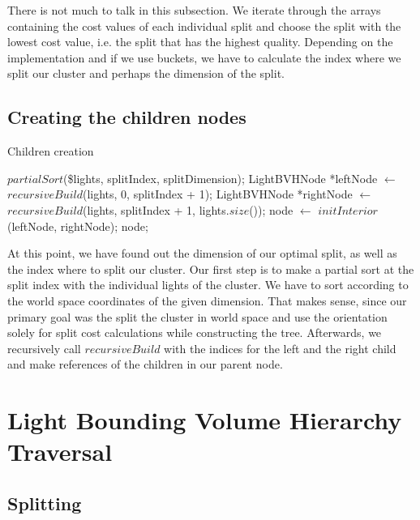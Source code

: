 There is not much to talk in this subsection. We iterate through the arrays containing the cost values of each individual split and choose the split with the lowest cost value, i.e. the split that has the highest quality. Depending on the implementation and if we use buckets, we have to calculate the index where we split our cluster and perhaps the dimension of the split.

\subsection{Creating the children nodes}

\begin{algorithm}
	\caption{Children creation}
	\label{alg:childrencreation}
	\begin{algorithmic}[1] %
		\State $partialSort$(\$lights, splitIndex, splitDimension);
		\State LightBVHNode *leftNode $\gets$ $recursiveBuild$(lights, 0, splitIndex + 1);
		\State LightBVHNode *rightNode $\gets$ $recursiveBuild$(lights, splitIndex + 1, lights.$size$());
		\State node $\gets$ $initInterior$(leftNode, rightNode);
		\State \Return node;
		\EndProcedure
	\end{algorithmic}
\end{algorithm}

At this point, we have found out the dimension of our optimal split, as well as the index where to split our cluster. Our first step is to make a partial sort at the split index with the individual lights of the cluster. We have to sort according to the world space coordinates of the given dimension. That makes sense, since our primary goal was the split the cluster in world space and use the orientation solely for split cost calculations while constructing the tree. Afterwards, we recursively call $recursiveBuild$ with the indices for the left and the right child and make references of the children in our parent node.

\section{Light Bounding Volume Hierarchy Traversal}
\label{sec:alg:tra}

\subsection{Splitting}
\label{subs:split}